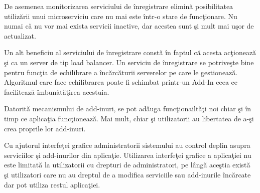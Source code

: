 \documentclass[a4paper,12pt]{report}
\begin{document}
De asemenea monitorizarea serviciului de \^inregistrare elimin\u a posibilitatea 
utiliz\u arii unui microserviciu care nu mai este \^intr-o stare de func\c tionare.
Nu numai c\u a nu vor mai exista servicii inactive, dar acestea sunt  \c si mult mai 
u\c sor de actualizat. 

Un alt beneficiu al serviciului de \^inregistrare const\u a \^in faptul c\u a acesta
ac\c tioneaz\u a \c si ca un server de tip load balancer.
Un serviciu de \^inregistrare se potrive\c ste bine pentru func\c tia de echilibrare a \^inc\u arc\u aturii
serverelor pe care le gestioneaz\u a. Algoritmul care face echilibrarea poate fi 
schimbat printr-un Add-In ceea ce faciliteaz\u a \^imbun\u at\u a\c tirea acestuia.

Datorit\u a mecanismului de add-inuri, se pot ad\u auga func\c tionailt\u a\c ti noi
chiar \c si \^in timp ce aplica\c tia func\c tioneaz\u a. Mai mult,
chiar \c si utilizatorii au libertatea de a-\c si crea proprile lor add-inuri. 

Cu ajutorul interfe\c tei grafice administratorii sistemului au control deplin 
asupra serviciilor \c si add-inurilor din aplica\c tie. Utilizarea interfe\c tei grafice 
a aplica\c tiei nu este limitat\u a la utilizatorii cu drepturi de administratori, 
pe l\^ang\u a ace\c stia exist\u a \c si utilizatori care nu au dreptul de a modifica serviciile 
sau add-inurile \^inc\u arcate dar pot utiliza restul aplica\c tiei.


\printbibliography
\end{document}
